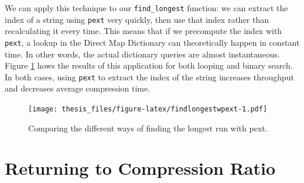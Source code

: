 \documentclass[12pt,twoside]{reedthesis}
\begin{document}
We can apply this technique to our \texttt{find\_longest} function: we can extract the index of a string using \texttt{pext} very quickly, then use that index rather than recalculating it every time. This means that if we precompute the index with \texttt{pext}, a lookup in the Direct Map Dictionary can theoretically happen in constant time. In other words, the actual dictionary queries are almost instantaneous. Figure \ref{fig:findlongestwpext} hows the results of this application for both looping and binary search. In both cases, using \texttt{pext} to extract the index of the string increases throughput and decreases average compression time.
\begin{figure}
\centering
\texttt{[image: thesis\_files/figure-latex/findlongestwpext-1.pdf]}
\caption{\label{fig:findlongestwpext}Comparing the different ways of finding the longest run with pext.}
\end{figure}
\hypertarget{returning-to-compression-ratio}{%
\section{Returning to Compression Ratio}\label{returning-to-compression-ratio}}
\end{document}
